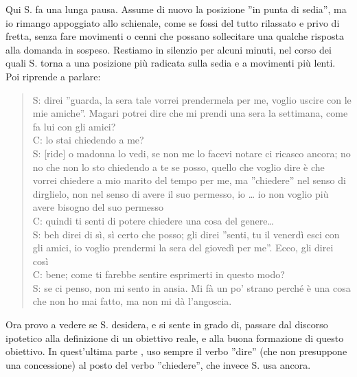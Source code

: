 \noindent Qui S. fa una lunga pausa.  Assume di nuovo la posizione ''in punta di sedia'', ma io rimango appoggiato allo schienale, come se fossi del tutto rilassato e privo di fretta, senza fare movimenti o cenni che possano sollecitare una qualche risposta alla domanda in sospeso. Restiamo in silenzio per alcuni minuti, nel corso dei quali S. torna a una posizione più radicata sulla sedia e a movimenti più lenti. Poi riprende a parlare:

\begin{verse}
S: direi ''guarda, la sera tale vorrei prendermela per me, voglio uscire con le mie amiche''. Magari potrei dire che mi prendi una sera la settimana, come fa lui con gli amici?\\
C: lo stai chiedendo a me?\\
S: [ride] o madonna lo vedi, se non me lo facevi notare ci ricasco ancora; no  no che non lo sto chiedendo a te se posso, quello che voglio dire è che vorrei chiedere a mio marito del tempo per me, ma ''chiedere'' nel senso di dirglielo, non nel senso di avere il suo permesso, io \ldots{} io non voglio più avere bisogno del suo permesso\\
C: quindi ti senti di potere chiedere una cosa del genere\ldots\\
S: beh direi di sì, sì certo che posso; gli direi ''senti, tu il venerdì esci con gli amici, io voglio prendermi la sera del giovedì per me''. Ecco, gli direi così\\
C: bene; come ti farebbe sentire esprimerti in questo modo?\\
S: se ci penso, non mi sento in ansia. Mi fà un po' strano perché è una cosa che non ho mai fatto, ma non mi dà l'angoscia.\\
\end{verse}

\noindent Ora provo a vedere se S. desidera, e si sente in grado di, passare dal discorso ipotetico alla definizione di un obiettivo reale, e alla buona formazione di questo obiettivo. In quest'ultima parte , uso sempre il verbo ''dire'' (che non presuppone una concessione) al posto del verbo ''chiedere'', che invece S. usa ancora.

